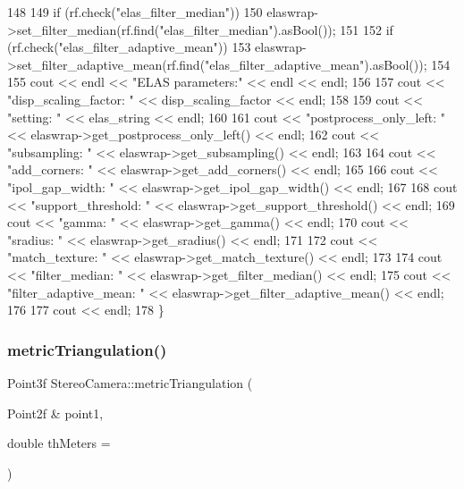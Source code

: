 \begin{DoxyCode}
148 
149     \textcolor{keywordflow}{if} (rf.check(\textcolor{stringliteral}{"elas\_filter\_median"}))
150         elaswrap->set\_filter\_median(rf.find(\textcolor{stringliteral}{"elas\_filter\_median"}).asBool());
151 
152     \textcolor{keywordflow}{if} (rf.check(\textcolor{stringliteral}{"elas\_filter\_adaptive\_mean"}))
153         elaswrap->set\_filter\_adaptive\_mean(rf.find(\textcolor{stringliteral}{"elas\_filter\_adaptive\_mean"}).asBool());
154 
155     cout << endl << \textcolor{stringliteral}{"ELAS parameters:"} << endl << endl;
156 
157     cout << \textcolor{stringliteral}{"disp\_scaling\_factor: "} << disp\_scaling\_factor << endl;
158 
159     cout << \textcolor{stringliteral}{"setting: "} << elas\_string << endl;
160 
161     cout << \textcolor{stringliteral}{"postprocess\_only\_left: "} << elaswrap->get\_postprocess\_only\_left() << endl;
162     cout << \textcolor{stringliteral}{"subsampling: "} << elaswrap->get\_subsampling() << endl;
163 
164     cout << \textcolor{stringliteral}{"add\_corners: "} << elaswrap->get\_add\_corners() << endl;
165 
166     cout << \textcolor{stringliteral}{"ipol\_gap\_width: "} << elaswrap->get\_ipol\_gap\_width() << endl;
167 
168     cout << \textcolor{stringliteral}{"support\_threshold: "} << elaswrap->get\_support\_threshold() << endl;
169     cout << \textcolor{stringliteral}{"gamma: "} << elaswrap->get\_gamma() << endl;
170     cout << \textcolor{stringliteral}{"sradius: "} << elaswrap->get\_sradius() << endl;
171 
172     cout << \textcolor{stringliteral}{"match\_texture: "} << elaswrap->get\_match\_texture() << endl;
173 
174     cout << \textcolor{stringliteral}{"filter\_median: "} << elaswrap->get\_filter\_median() << endl;
175     cout << \textcolor{stringliteral}{"filter\_adaptive\_mean: "} << elaswrap->get\_filter\_adaptive\_mean() << endl;
176 
177     cout << endl;
178 \}
\end{DoxyCode}
\mbox{\label{classStereoCamera_a2fcd3e1767bcf04716b0e2ac76098430}} 
\subsubsection{\texorpdfstring{metric\+Triangulation()}{metricTriangulation()}\hspace{0.1cm}{\footnotesize\ttfamily [1/2]}}
{\footnotesize\ttfamily Point3f Stereo\+Camera\+::metric\+Triangulation (\begin{DoxyParamCaption}\item[{Point2f \&}]{point1,  }\item[{double}]{th\+Meters = {} }\end{DoxyParamCaption})}



